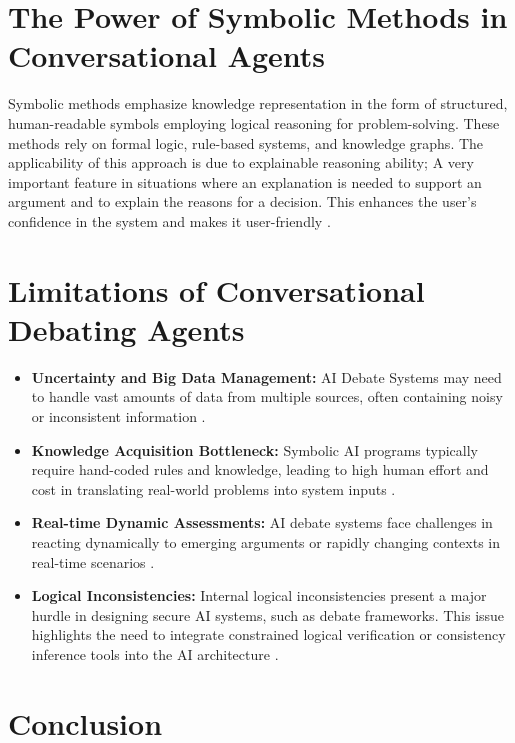 \documentclass[conference]{IEEEtran}
\begin{document}
\section{The Power of Symbolic Methods in Conversational Agents}
Symbolic methods emphasize knowledge representation in the form of structured, human-readable symbols employing logical reasoning for problem-solving. These methods rely on formal logic, rule-based systems, and knowledge graphs. The applicability of this approach is due to explainable reasoning ability; A very important feature in situations where an explanation is needed to support an argument and to explain the reasons for a decision. This enhances the user's confidence in the system and makes it user-friendly \cite{b11}.

\section{Limitations of Conversational Debating Agents}
\begin{itemize}
    \item \textbf{Uncertainty and Big Data Management:} AI Debate Systems may need to handle vast amounts of data from multiple sources, often containing noisy or inconsistent information \cite{b11}.
    
    \item \textbf{Knowledge Acquisition Bottleneck:} Symbolic AI programs typically require hand-coded rules and knowledge, leading to high human effort and cost in translating real-world problems into system inputs \cite{b11}.
    
    \item \textbf{Real-time Dynamic Assessments:} AI debate systems face challenges in reacting dynamically to emerging arguments or rapidly changing contexts in real-time scenarios \cite{b11}.
    
    \item \textbf{Logical Inconsistencies:} Internal logical inconsistencies present a major hurdle in designing secure AI systems, such as debate frameworks. This issue highlights the need to integrate constrained logical verification or consistency inference tools into the AI architecture \cite{b10}.
\end{itemize}

\section{Conclusion}
\end{document}
